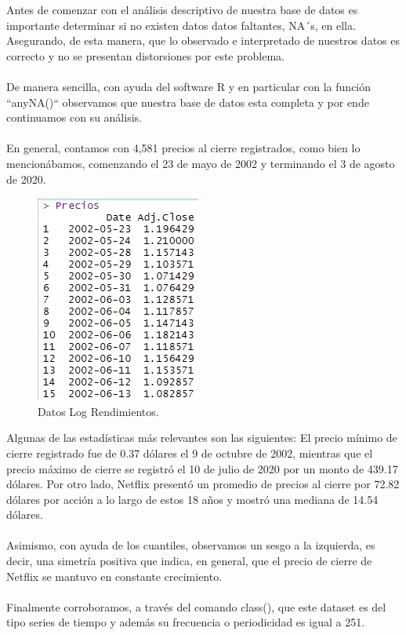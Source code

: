 

Antes de comenzar con el análisis descriptivo de nuestra base de datos es importante determinar si no existen datos datos faltantes, NA´s, en ella. Asegurando, de esta manera, que lo observado e interpretado de nuestros datos es correcto y no se presentan distorsiones por este problema. 
\\\\
De manera sencilla, con ayuda del software R y en particular con la función ``anyNA()`` observamos que nuestra base de datos esta completa y por ende continuamos con su análisis.
\\\\
En general, contamos con 4,581 precios al cierre registrados, como bien lo mencionábamos, comenzando el 23 de mayo de 2002 y terminando el 3 de agosto de 2020.

\begin{figure}[!ht]
    \centering
    \includegraphics[scale=.75]{Graficos/HeadPrecios.jpg}
   \caption{Datos Log Rendimientos.}
    \label{Datos Log Rendimientos.}
\end{figure}

Algunas de las estadísticas más relevantes son las siguientes: El precio mínimo de cierre registrado fue de 0.37 dólares el 9 de octubre de 2002, mientras que el precio máximo de cierre se registró el 10 de julio de 2020 por un monto de 439.17 dólares. Por otro lado, Netflix presentó un promedio de precios al cierre por 72.82 dólares por acción a lo largo de estos 18 años y mostró una mediana de 14.54 dólares. 
\\\\
Asimismo, con ayuda de los cuantiles, observamos un sesgo a la izquierda, es decir, una simetría positiva que indica, en general, que el precio de cierre de Netflix se mantuvo en constante crecimiento.
\\\\
Finalmente corroboramos, a través del comando class(), que este dataset es del tipo series de tiempo y además su frecuencia o periodicidad es igual a 251.
\newpage
